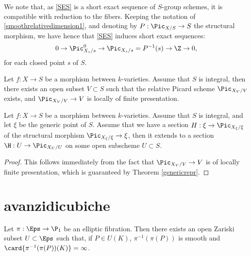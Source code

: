 We note that, as \ref{SES} is a short exact sequence of $S$-group schemes, it is compatible with reduction to the fibers. Keeping the notation of \ref{smoothrelativedimension1}, and denoting by $P:\Pic_{X/S} \rightarrow S$ the structural morphism, we have hence that \ref{SES} induces short exact sequences:
\begin{equation}\label{SESreduced}
	0 \rightarrow \Pic^0_{X_s/s} \rightarrow \Pic_{X_s/s}=P^{-1}(s) \rightarrow \Z \rightarrow 0,
\end{equation}
for each closed point $s$ of $S$.


\begin{theorem}\label{genericrepr}
	Let $f:X \rightarrow S$ be a morphism between $k$-varieties. Assume that $S$ is integral, then there exists an open subset $V \subset S$ such that the relative Picard scheme $\Pic_{X_V/V}$ exists, and $\Pic_{X_V/V}\rightarrow V$ is locally of finite presentation.
\end{theorem}

\begin{corollary}\label{divisorgeneric}
	Let $f:X \rightarrow S$ be a morphism between $k$-varieties. Assume that $S$ is integral, and let $\xi$ be the generic point of $S$. Assume that we have a section $H:\xi \rightarrow \Pic_{X_{\xi}/\xi}$ of the structural morphism $\Pic_{X_{\xi}/\xi} \rightarrow \xi$, then it extends to a section $\H:U \rightarrow \Pic_{X_U/U}$ on some open subscheme $U \subset S$.
\end{corollary}

\begin{proof}
	This follows immediately from the fact that $\Pic_{X_V/V}\rightarrow V$ is of locally finite presentation, which is guaranteed by Theorem \ref{genericrepr}.
\end{proof}

\section{avanzidicubiche}


\begin{lemma}\label{positivegenericrank}
	Let $\pi:\Eps \rightarrow \P_1$ be an elliptic fibration. Then there exists an open Zariski subset $U \subset \Eps$ such that, if $P \in U(K)$, $\pi^{-1}(\pi(P))$ is smooth and $\card{\pi^{-1}(\pi(P))(K)}=\infty$. 
\end{lemma}

